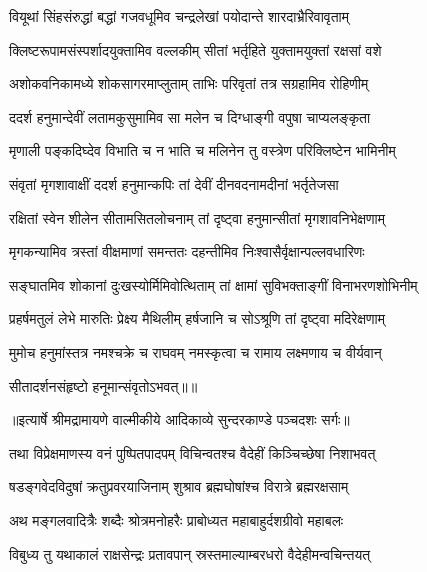 \twolineshloka
{वियूथां सिंहसंरुद्धां बद्धां गजवधूमिव}
{चन्द्रलेखां पयोदान्ते शारदाभ्रैरिवावृताम्} %

\twolineshloka
{क्लिष्टरूपामसंस्पर्शादयुक्तामिव वल्लकीम्}
{सीतां भर्तृहिते युक्तामयुक्तां रक्षसां वशे} %

\twolineshloka
{अशोकवनिकामध्ये शोकसागरमाप्लुताम्}
{ताभिः परिवृतां तत्र सग्रहामिव रोहिणीम्} %

\twolineshloka
{ददर्श हनुमान्देवीं लतामकुसुमामिव}
{सा मलेन च दिग्धाङ्गी वपुषा चाप्यलङ्कृता} %

\twolineshloka
{मृणाली पङ्कदिघ्देव विभाति च न भाति च}
{मलिनेन तु वस्त्रेण परिक्लिष्टेन भामिनीम्} %

\twolineshloka
{संवृतां मृगशावाक्षीं ददर्श हनुमान्कपिः}
{तां देवीं दीनवदनामदीनां भर्तृतेजसा} %

\twolineshloka
{रक्षितां स्वेन शीलेन सीतामसितलोचनाम्}
{तां दृष्ट्वा हनुमान्सीतां मृगशावनिभेक्षणाम्} %

\twolineshloka
{मृगकन्यामिव त्रस्तां वीक्षमाणां समन्ततः}
{दहन्तीमिव निःश्वासैर्वृक्षान्पल्लवधारिणः} %

\twolineshloka
{सङ्घातमिव शोकानां दुःखस्योर्मिमिवोत्थिताम्}
{तां क्षामां सुविभक्ताङ्गीं विनाभरणशोभिनीम्} %

\twolineshloka
{प्रहर्षमतुलं लेभे मारुतिः प्रेक्ष्य मैथिलीम्}
{हर्षजानि च सोऽश्रूणि तां दृष्ट्वा मदिरेक्षणाम्} %

\twolineshloka
{मुमोच हनुमांस्तत्र नमश्चक्रे च राघवम्}
{नमस्कृत्वा च रामाय लक्ष्मणाय च वीर्यवान्} %

{सीतादर्शनसंहृष्टो हनूमान्संवृतोऽभवत्॥॥} %

\addtocounter{shlokacount}{1}


{॥इत्यार्षे श्रीमद्रामायणे वाल्मीकीये आदिकाव्ये सुन्दरकाण्डे पञ्चदशः सर्गः॥}


\twolineshloka
{तथा विप्रेक्षमाणस्य वनं पुष्पितपादपम्}
{विचिन्वतश्च वैदेहीं किञ्चिच्छेषा निशाभवत्} %

\twolineshloka
{षडङ्गवेदविदुषां क्रतुप्रवरयाजिनाम्}
{शुश्राव ब्रह्मघोषांश्च विरात्रे ब्रह्मरक्षसाम्} %

\twolineshloka
{अथ मङ्गलवादित्रैः शब्दैः श्रोत्रमनोहरैः}
{प्राबोध्यत महाबाहुर्दशग्रीवो महाबलः} %

\twolineshloka
{विबुध्य तु यथाकालं राक्षसेन्द्रः प्रतावपान्}
{स्रस्तमाल्याम्बरधरो वैदेहीमन्वचिन्तयत्} %

